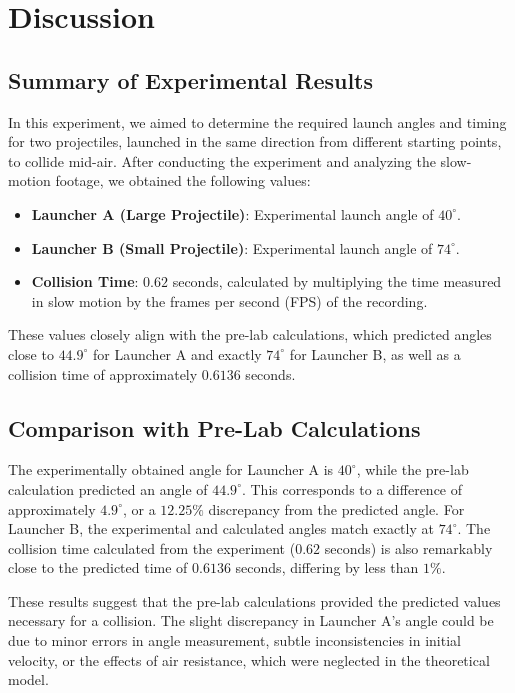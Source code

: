 \documentclass[12pt]{article}
\begin{document}
\section{Discussion}

\subsection{Summary of Experimental Results}
In this experiment, we aimed to determine the required launch angles and timing for two projectiles, launched in the same direction from different starting points, to collide mid-air. After conducting the experiment and analyzing the slow-motion footage, we obtained the following values:
\begin{itemize}
    \item \textbf{Launcher A (Large Projectile)}: Experimental launch angle of \( 40^\circ \).
    \item \textbf{Launcher B (Small Projectile)}: Experimental launch angle of \( 74^\circ \).
    \item \textbf{Collision Time}: \( 0.62 \) seconds, calculated by multiplying the time measured in slow motion by the frames per second (FPS) of the recording.
\end{itemize}

These values closely align with the pre-lab calculations, which predicted angles close to \( 44.9^\circ \) for Launcher A and exactly \( 74^\circ \) for Launcher B, as well as a collision time of approximately \( 0.6136 \) seconds.

\subsection{Comparison with Pre-Lab Calculations}
The experimentally obtained angle for Launcher A is \( 40^\circ \), while the pre-lab calculation predicted an angle of \( 44.9^\circ \). This corresponds to a difference of approximately \( 4.9^\circ \), or a \( 12.25\% \) discrepancy from the predicted angle. For Launcher B, the experimental and calculated angles match exactly at \( 74^\circ \). The collision time calculated from the experiment (\( 0.62 \) seconds) is also remarkably close to the predicted time of \( 0.6136 \) seconds, differing by less than \( 1\% \).

These results suggest that the pre-lab calculations provided the predicted values necessary for a collision. The slight discrepancy in Launcher A’s angle could be due to minor errors in angle measurement, subtle inconsistencies in initial velocity, or the effects of air resistance, which were neglected in the theoretical model.
\end{document}
